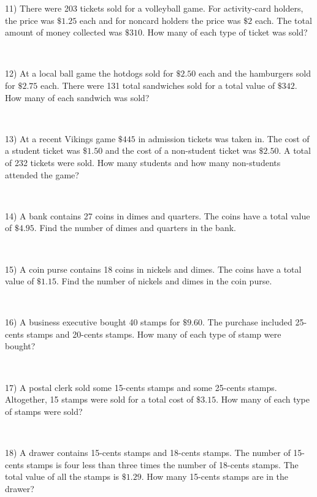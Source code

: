 {11) There were 203 tickets sold for a volleyball game. For activity-card
holders, the price was $\$1.25$ each and for
noncard holders the price was $\$2$ each. The total
amount of money collected was $\$310$. How many of each type of
ticket was sold?\par
~\par

12) At a local ball game the hotdogs sold for $\$2.50$ each and the
hamburgers sold for $\$2.75$ each. There were 131 total
sandwiches sold for a total value of $\$342$.  How many of
each sandwich was sold?\par
~\par

13) At a recent Vikings game $\$445$ in admission tickets was taken
in. The cost of a student ticket was $\$1.50$ and the
cost of a non-student ticket was $\$2.50$. A total of
232 tickets were sold. How many students and how many non-students attended the game?\par
~\par

14) A bank contains 27 coins in dimes and quarters. The coins have a total
value  of $\$4.95$. Find the number of dimes and quarters
in the bank.\par
~\par

15) A coin purse contains 18 coins in nickels and dimes. The coins have a
total value of $\$1.15$. Find the number of nickels
and dimes in the coin purse.\par
~\par

16) A business executive bought 40 stamps for $\$9.60$. The purchase
included 25-cents stamps and 20-cents stamps. How
many of each type of stamp were bought?\par
~\par

17) A postal clerk sold some 15-cents stamps and some 25-cents
stamps. Altogether, 15 stamps were sold for a total cost
of $\$3.15$. How many of each type of stamps were sold?\par
~\par

18) A drawer contains 15-cents stamps and 18-cents stamps. The
number of 15-cents stamps is  four less than three times the
number of 18-cents stamps. The total value of all the
stamps is $\$1.29$. How many 15-cents stamps are in the
drawer?\par
~\par

}
